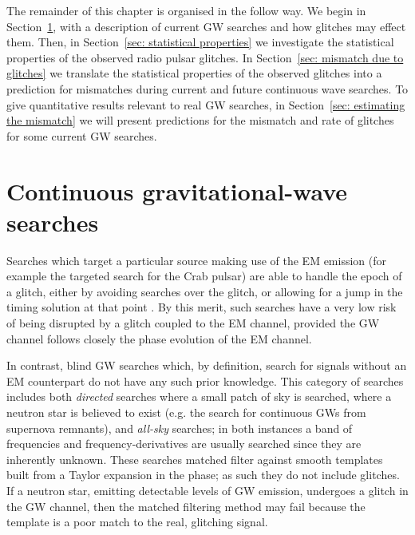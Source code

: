 \documentclass[../full_thesis/full_thesis.tex]{subfiles}
\begin{document}

The remainder of this chapter is organised in the follow way. We begin in
Section~\ref{sec: continuous gravitational-wave searches}, with a description of
current GW searches and how glitches may effect them. Then, in Section~\ref{sec:
statistical properties} we investigate the statistical properties of the
observed radio pulsar glitches. In Section~\ref{sec: mismatch due to glitches} we
translate the statistical properties of the observed glitches into a prediction
for mismatches during current and future continuous wave searches. To give
quantitative results relevant to real GW searches, in Section~\ref{sec: estimating
the mismatch} we will present predictions for the mismatch and rate of glitches for
some current GW searches.

\section{Continuous gravitational-wave searches}
\label{sec: continuous gravitational-wave searches}

Searches which target a particular source making use of the EM emission (for
example the \citet{ligo2010} targeted search for the Crab pulsar) are able to
handle the epoch of a glitch, either by avoiding searches over the glitch, or
allowing for a jump in the timing solution at that point \citep{ligo2010}. By
this merit, such searches have a very low risk of being disrupted by a glitch
coupled to the EM channel, provided the GW channel follows closely the phase
evolution of the EM channel.

In contrast, blind GW searches which, by definition, search for signals without an
EM counterpart do not have any such prior knowledge. This category of searches
includes both \emph{directed} searches where a small patch of sky is searched,
where a neutron star is believed to exist (e.g. the \citet{ligo_SNR2015} search
for continuous GWs from supernova remnants), and \emph{all-sky} searches; in
both instances a band of frequencies and frequency-derivatives are usually
searched since they are inherently unknown. These searches
matched filter against smooth templates built from a Taylor expansion in
the phase; as such they do not include glitches. If a neutron star, emitting
detectable levels of GW emission, undergoes a glitch in the GW channel, then the
matched filtering method may fail because the template is a poor match to the
real, glitching signal.
\end{document}

